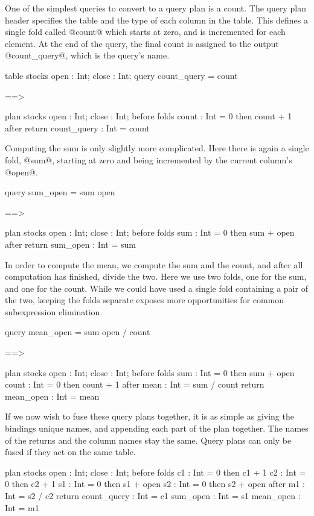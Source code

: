 One of the simplest queries to convert to a query plan is a count.
The query plan header specifies the table and the type of each column in the table.
This defines a single fold called @count@ which starts at zero, and is incremented for each element.
At the end of the query, the final count is assigned to the output @count_query@, which is the query's name.
\begin{code}
table stocks { open : Int; close : Int; }
query count_query = count

==>

plan stocks { open : Int; close : Int; }
before { }
folds  { count : Int = 0 then count + 1 }
after  { }
return { count_query : Int = count }
\end{code}

Computing the sum is only slightly more complicated.
Here there is again a single fold, @sum@, starting at zero and being incremented by the current column's @open@.
\begin{code}
query sum_open = sum open


==>

plan stocks { open : Int; close : Int; }
before { }
folds  { sum : Int = 0 then sum + open }
after  { }
return { sum_open : Int = sum }
\end{code}

In order to compute the mean, we compute the sum and the count, and after all computation has finished, divide the two.
Here we use two folds, one for the sum, and one for the count.
While we could have used a single fold containing a pair of the two, keeping the folds separate exposes more opportunities for common subexpression elimination.
\begin{code}
query mean_open = sum open / count

==>

plan stocks { open : Int; close : Int; }
before { }
folds  { sum       : Int = 0 then sum + open 
         count     : Int = 0 then count + 1 }
after  { mean      : Int = sum / count }
return { mean_open : Int = mean }
\end{code}

If we now wish to fuse these query plans together, it is as simple as giving the bindings unique names, and appending each part of the plan together.
The names of the returns and the column names stay the same.
Query plans can only be fused if they act on the same table.
\begin{code}
plan stocks { open : Int; close : Int; }
before { }
folds  { c1 : Int = 0 then c1 + 1
         c2 : Int = 0 then c2 + 1
         s1 : Int = 0 then s1 + open 
         s2 : Int = 0 then s2 + open }
after  { m1 : Int = s2 / c2 }
return { count_query : Int = c1
         sum_open    : Int = s1
         mean_open   : Int = m1 }
\end{code}


